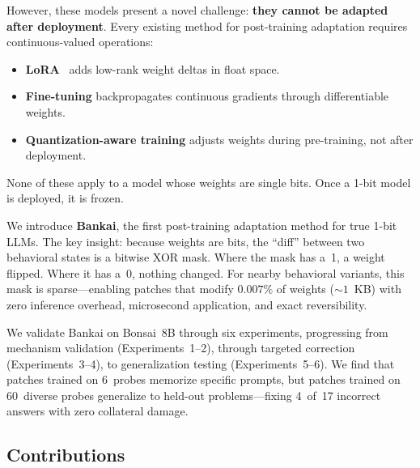 \documentclass[11pt,a4paper]{article}
\begin{document}
However, these models present a novel challenge: \textbf{they cannot be
adapted after deployment}. Every existing method for post-training
adaptation requires continuous-valued operations:

\begin{itemize}[nosep]
  \item \textbf{LoRA}~\citep{hu2021lora} adds low-rank weight deltas in
    float space.
  \item \textbf{Fine-tuning} backpropagates continuous gradients through
    differentiable weights.
  \item \textbf{Quantization-aware training} adjusts weights during
    pre-training, not after deployment.
\end{itemize}

None of these apply to a model whose weights are single bits. Once a 1-bit
model is deployed, it is frozen.

We introduce \textbf{Bankai}, the first post-training adaptation method
for true 1-bit LLMs. The key insight: because weights are bits, the
``diff'' between two behavioral states is a bitwise XOR mask. Where the
mask has a~1, a weight flipped. Where it has a~0, nothing changed. For
nearby behavioral variants, this mask is sparse---enabling patches that
modify $0.007\%$ of weights (${\sim}1$~KB) with zero inference overhead,
microsecond application, and exact reversibility.

We validate Bankai on Bonsai~8B through six experiments, progressing from
mechanism validation (Experiments~1--2), through targeted correction
(Experiments~3--4), to generalization testing (Experiments~5--6). We find
that patches trained on 6~probes memorize specific prompts, but patches
trained on 60~diverse probes generalize to held-out problems---fixing
4~of~17 incorrect answers with zero collateral damage.

\subsection{Contributions}
\end{document}
